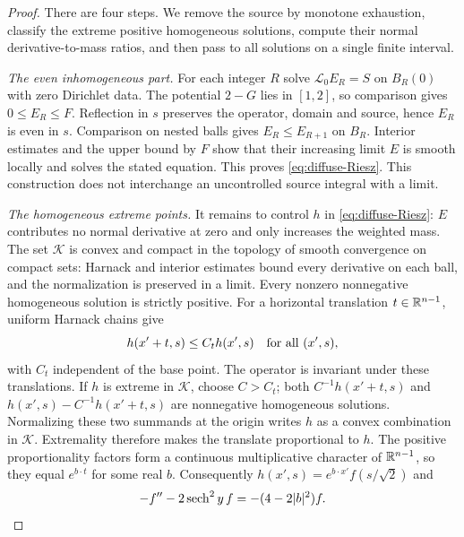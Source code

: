 \begin{proof}
There are four steps. We remove the source by monotone exhaustion,
classify the extreme positive homogeneous solutions, compute their
normal derivative-to-mass ratios, and then pass to all solutions on a
single finite interval.

\emph{The even inhomogeneous part.}
For each integer $R$ solve $\mathcal L_0 E_R=S$ on $B_R(0)$ with zero
Dirichlet data. The potential $2-G$ lies in $[1,2]$, so comparison gives
$0\le E_R\le F$. Reflection in $s$ preserves the operator, domain and
source, hence $E_R$ is even in $s$. Comparison on nested balls gives
$E_R\le E_{R+1}$ on $B_R$. Interior estimates and the upper bound by $F$
show that their increasing limit $E$ is smooth locally and solves the
stated equation. This proves \eqref{eq:diffuse-Riesz}. This construction
does not interchange an uncontrolled source integral with a limit.

\emph{The homogeneous extreme points.}
It remains to control $h$ in \eqref{eq:diffuse-Riesz}: $E$ contributes
no normal derivative at zero and only increases the weighted mass.
The set $\mathcal K$
is convex and compact in the topology of smooth convergence on compact
sets: Harnack and interior estimates bound every derivative on each ball,
and the normalization is preserved in a limit. Every nonzero nonnegative
homogeneous solution is strictly positive. For a horizontal translation
$t\in\mathbb R^{n-1}$, uniform Harnack chains give
\[
 h(x'+t,s)\le C_t h(x',s)\quad\hbox{for all }(x',s),
\]
with $C_t$ independent of the base point. The operator is invariant under
these translations. If $h$ is extreme in $\mathcal K$, choose
$C>C_t$; both $C^{-1}h(x'+t,s)$ and
$h(x',s)-C^{-1}h(x'+t,s)$ are nonnegative homogeneous solutions.
Normalizing these two summands at
the origin writes $h$ as a convex combination in $\mathcal K$.
Extremality therefore makes the translate proportional to $h$.
The positive proportionality factors form a continuous multiplicative
character of $\mathbb R^{n-1}$, so they equal $e^{b\cdot t}$ for some real $b$.
Consequently $h(x',s)=e^{b\cdot x'}f(s/\sqrt2)$ and
\begin{equation}\label{eq:diffuse-extremal-ode}
 -f''-2\operatorname{sech}^2 y\,f=-(4-2|b|^2)f.
\end{equation}


\end{proof}
